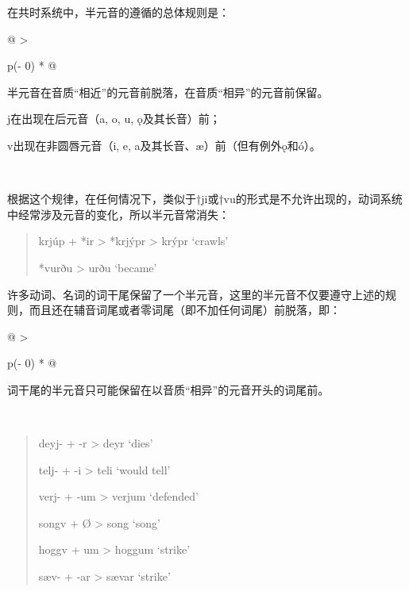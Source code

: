 在共时系统中，半元音的遵循的总体规则是：

\begin{longtable}[]{@{}
  >{\raggedright\arraybackslash}p{(\columnwidth - 0\tabcolsep) * }@{}}
\toprule\noalign{}
\begin{minipage}[b]{\linewidth}\raggedright
半元音在音质``相近''的元音前脱落，在音质``相异''的元音前保留。

j在出现在后元音（a, o, u, ǫ及其长音）前；

v出现在非圆唇元音（i, e, a及其长音、æ）前（但有例外ǫ和ó）。
\end{minipage} \\
\midrule\noalign{}
\endhead
\bottomrule\noalign{}
\endlastfoot
\end{longtable}

根据这个规律，在任何情况下，类似于†ji或†vu的形式是不允许出现的，动词系统中经常涉及元音的变化，所以半元音常消失：

\begin{quote}
krjúp + *ir \textgreater{} *krjýpr \textgreater{} krýpr `crawls'

*vurðu \textgreater{} urðu `became'
\end{quote}

许多动词、名词的词干尾保留了一个半元音，这里的半元音不仅要遵守上述的规则，而且还在辅音词尾或者零词尾（即不加任何词尾）前脱落，即：

\begin{longtable}[]{@{}
  >{\raggedright\arraybackslash}p{(\columnwidth - 0\tabcolsep) * }@{}}
\toprule\noalign{}
\begin{minipage}[b]{\linewidth}\raggedright
词干尾的半元音只可能保留在以音质``相异''的元音开头的词尾前。
\end{minipage} \\
\midrule\noalign{}
\endhead
\bottomrule\noalign{}
\endlastfoot
\end{longtable}

\begin{quote}
deyj- + -r \textgreater{} deyr `dies'

telj- + -i \textgreater{} teli `would tell'

verj- + -um \textgreater{} verjum `defended'

songv + Ø \textgreater{} song `song'

hoggv + um \textgreater{} hoggum `strike'

sæv- + -ar \textgreater{} sævar `strike'
\end{quote}

